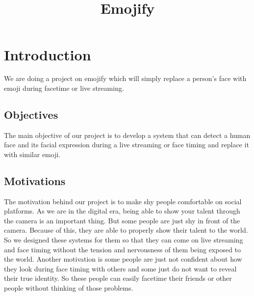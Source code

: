 \documentclass[conference]{IEEEtran}
\begin{document}
\title{Emojify}

\author{
\and
{}
\and
{}
}

\maketitle


\section{Introduction}
We are doing a project on emojify which will simply replace a person’s face with emoji during facetime or live streaming.
\subsection{Objectives}
The main objective of our project is to develop a system that can detect a human face and its facial expression during a live streaming or face timing and replace it with similar emoji.

\subsection{Motivations}
The motivation behind our project is to make shy people comfortable on social platforms. As we are in the digital era, being able to show your talent through the camera is an important thing. But some people are just shy in front of the camera. Because of this, they are able to properly show their talent to the world. So we designed these systems for them so that they can come on live streaming and face timing without the tension and nervousness of them being exposed to the world.
Another motivation is some people are just not confident about how they look during face timing with others and some just do not want to reveal their true identity. So these people can easily facetime their friends or other people without thinking of those problems.
\end{document}
